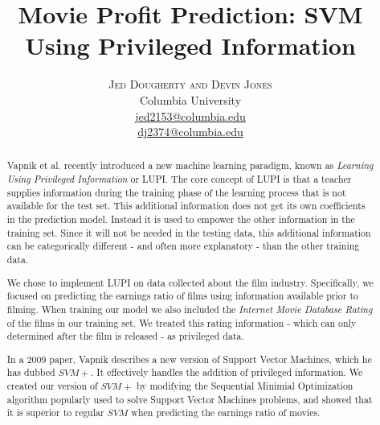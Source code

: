 \documentclass[twoside]{article}\usepackage[]{graphicx}\usepackage[]{color}
\title{\vspace{-15mm}\fontsize{24pt}{10pt}\selectfont\textbf{Movie Profit Prediction: SVM Using Privileged Information }} %
\author{
\large
\textsc{Jed Dougherty and Devin Jones}\\[2mm] %
\normalsize Columbia University \\ %
\normalsize \href{mailto:jed2153@columbia.edu}{jed2153@columbia.edu} \\
\normalsize \href{mailto:dj2374@columbia.edu}{dj2374@columbia.edu} \\
\vspace{-5mm}
}
\date{}
\begin{document}
\maketitle %

\thispagestyle{fancy} %


\begin{abstract}

\noindent
Vapnik et al. recently introduced a new machine learning paradigm, known as 
\emph{Learning Using Privileged Information} or LUPI. The core concept of LUPI is that
a teacher supplies information during the training phase of the learning process
that is not available for the test set. This additional information does not get its
own coefficients in the prediction model. Instead it is used to empower the other information in the training set.
Since it will not be needed in the testing data, this additional information can be
categorically different - and often more explanatory - than the other training data.

We chose to implement LUPI on data collected about the film industry. Specifically,
we focused on predicting the earnings ratio of films using information available
prior to filming. When training our model we also included the \emph{Internet Movie Database Rating}
of the films in our training set. We treated this rating information - which
can only determined after the film is released - as privileged data.

In a 2009 paper\cite{Vapnik2009544}, Vapnik describes a new version of Support Vector Machines, which he has dubbed $SVM+$.
It effectively handles the addition of privileged information. We created our version of $SVM+$
by modifying the Sequential Minimial Optimization algorithm popularly used to
solve Support Vector Machines problems, and showed that it is superior to regular
$SVM$ when predicting the earnings ratio of movies.

\end{abstract}

\end{document}
